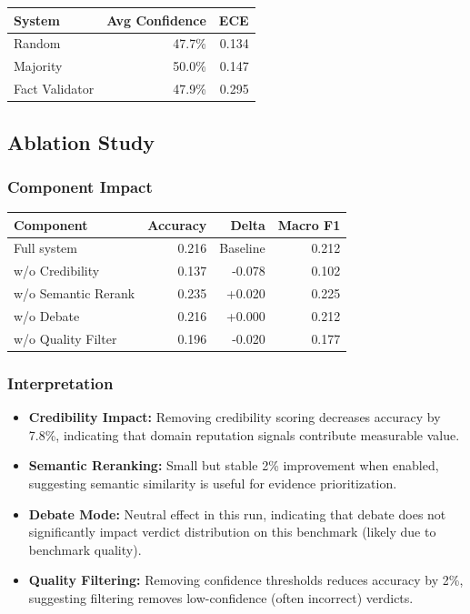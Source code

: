 \documentclass[12pt,a4paper,twoside]{article}
\begin{document}
\begin{table}[H]
    \centering
    \begin{tabular}{|l|r|r|}
        \hline
        \textbf{System} & \textbf{Avg Confidence} & \textbf{ECE} \\
        \hline
        Random & 47.7\% & 0.134 \\
        Majority & 50.0\% & 0.147 \\
        Fact Validator & 47.9\% & 0.295 \\
        \hline
    \end{tabular}
\end{table}

\subsection{Ablation Study}

\subsubsection{Component Impact}

\begin{table}[H]
    \centering
    \begin{tabular}{|l|r|r|r|}
        \hline
        \textbf{Component} & \textbf{Accuracy} & \textbf{Delta} & \textbf{Macro F1} \\
        \hline
        Full system & 0.216 & Baseline & 0.212 \\
        w/o Credibility & 0.137 & -0.078 & 0.102 \\
        w/o Semantic Rerank & 0.235 & +0.020 & 0.225 \\
        w/o Debate & 0.216 & +0.000 & 0.212 \\
        w/o Quality Filter & 0.196 & -0.020 & 0.177 \\
        \hline
    \end{tabular}
\end{table}

\subsubsection{Interpretation}

\begin{itemize}
    \item \textbf{Credibility Impact:} Removing credibility scoring decreases accuracy by 7.8\%, indicating that domain reputation signals contribute measurable value.
    \item \textbf{Semantic Reranking:} Small but stable 2\% improvement when enabled, suggesting semantic similarity is useful for evidence prioritization.
    \item \textbf{Debate Mode:} Neutral effect in this run, indicating that debate does not significantly impact verdict distribution on this benchmark (likely due to benchmark quality).
    \item \textbf{Quality Filtering:} Removing confidence thresholds reduces accuracy by 2\%, suggesting filtering removes low-confidence (often incorrect) verdicts.
\end{itemize}
\end{document}
